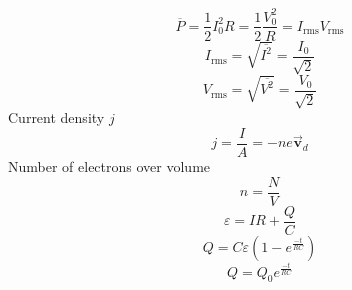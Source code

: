 \documentclass[12pt,landscape]{article}
\begin{document}
\begin{multicols}{4}
    \begin{equation*}
        \overbar{P} = \frac{1}{2} I_0^2 R = \frac{1}{2} \frac{V_0^2}{R}= I_{\text{rms}} V_{\text{rms}}
    \end{equation*}
    \begin{equation*}
        I_{\text{rms}} = \sqrt{\overbar{I^2}} = \frac{I_0}{\sqrt{2}}
    \end{equation*}
    \begin{equation*}
        V_{\text{rms}} = \sqrt{\overbar{V^2}} = \frac{V_0}{\sqrt{2}}
    \end{equation*}
    Current density $j$
    \begin{equation*}
        j = \frac{I}{A} = -n e \vec{\mathbf{v}}_d
    \end{equation*}
    Number of electrons over volume
    \begin{equation*}
        n = \frac{N}{V}
    \end{equation*}
    \begin{equation*}
        \varepsilon = IR + \frac{Q}{C}
    \end{equation*}
    \begin{equation*}
        Q = C\varepsilon \left(1 - e^{\frac{-t}{RC}} \right)
    \end{equation*}
    \begin{equation*}
        Q = Q_0 e^{\frac{-t}{RC}}
    \end{equation*}


\end{multicols}
\end{document}
